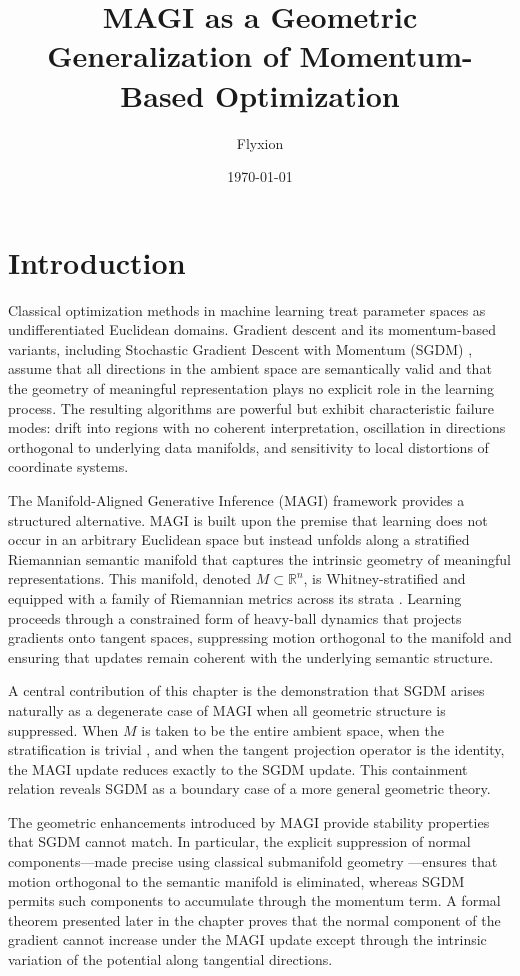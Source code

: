 \documentclass[12pt]{article}
\title{MAGI as a Geometric Generalization of Momentum-Based Optimization}
\author{Flyxion}
\date{\today}
\begin{document}
\maketitle
\section{Introduction}

Classical optimization methods in machine learning treat parameter spaces as undifferentiated Euclidean domains. Gradient descent and its momentum-based variants, including Stochastic Gradient Descent with Momentum (SGDM) \citep{Polyak1964,Sutskever2013}, assume that all directions in the ambient space are semantically valid and that the geometry of meaningful representation plays no explicit role in the learning process. The resulting algorithms are powerful but exhibit characteristic failure modes: drift into regions with no coherent interpretation, oscillation in directions orthogonal to underlying data manifolds, and sensitivity to local distortions of coordinate systems.

The Manifold-Aligned Generative Inference (MAGI) framework provides a structured alternative. MAGI is built upon the premise that learning does not occur in an arbitrary Euclidean space but instead unfolds along a stratified Riemannian semantic manifold that captures the intrinsic geometry of meaningful representations. This manifold, denoted $M \subset \mathbb{R}^n$, is Whitney-stratified \citep{Whitney1965,Thom1969,Mather1973} and equipped with a family of Riemannian metrics across its strata \citep{LeeRiemannian2018,doCarmoRiemannian1992}. Learning proceeds through a constrained form of heavy-ball dynamics \citep{Polyak1964,Wibisono2016} that projects gradients onto tangent spaces, suppressing motion orthogonal to the manifold and ensuring that updates remain coherent with the underlying semantic structure.

A central contribution of this chapter is the demonstration that SGDM arises naturally as a degenerate case of MAGI when all geometric structure is suppressed. When $M$ is taken to be the entire ambient space, when the stratification is trivial \citep{GoreskyMacPherson1988}, and when the tangent projection operator is the identity, the MAGI update reduces exactly to the SGDM update. This containment relation reveals SGDM as a boundary case of a more general geometric theory.

The geometric enhancements introduced by MAGI provide stability properties that SGDM cannot match. In particular, the explicit suppression of normal components—made precise using classical submanifold geometry \citep{doCarmoRiemannian1992,CheegerEbin1975}—ensures that motion orthogonal to the semantic manifold is eliminated, whereas SGDM permits such components to accumulate through the momentum term. A formal theorem presented later in the chapter proves that the normal component of the gradient cannot increase under the MAGI update except through the intrinsic variation of the potential along tangential directions.
\end{document}
